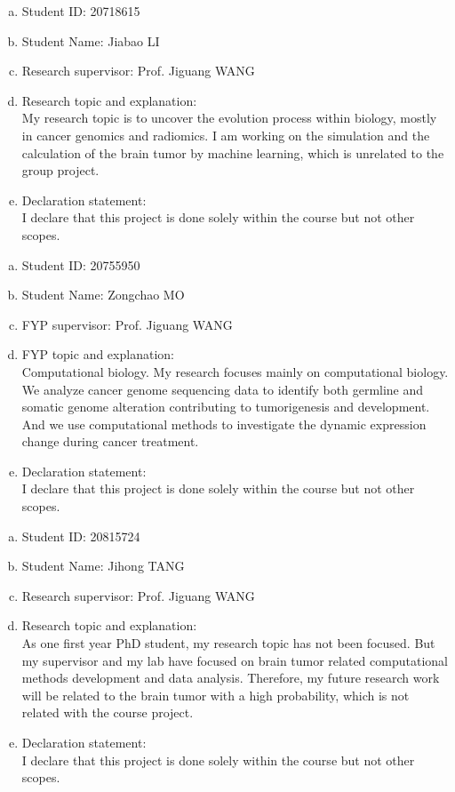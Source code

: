 \documentclass[11pt]{article}
\begin{document}
\begin{member}
	\begin{enumerate}[(a)]
		\item Student ID: 20718615
		\item Student Name: Jiabao LI
		\item Research supervisor: Prof. Jiguang WANG
		\item Research topic and explanation: \\
		My research topic is to uncover the evolution process within biology, mostly in cancer genomics and radiomics. I am working on the simulation and the calculation of the brain tumor by machine learning, which is unrelated to the group project.
		\item Declaration statement: \\
		I declare that this project is done solely within the course but not other scopes.
	\end{enumerate}
\end{member}

\begin{member}
	\begin{enumerate}[(a)]
		\item Student ID: 20755950
		\item Student Name:  Zongchao MO
		\item FYP supervisor: Prof. Jiguang WANG
		\item FYP topic and explanation: \\
		Computational biology. My research focuses mainly on computational biology. We analyze cancer genome sequencing data to identify both germline and somatic genome alteration contributing to tumorigenesis and development. And we use computational methods to investigate the dynamic expression change during cancer treatment.
		\item Declaration statement: \\
		I declare that this project is done solely within the course but not other scopes.
	\end{enumerate}
\end{member}

\begin{member}
	\begin{enumerate}[(a)]
		\item Student ID: 20815724
		\item Student Name: Jihong TANG
		\item Research supervisor: Prof. Jiguang WANG
		\item Research topic and explanation: \\
		As one first year PhD student, my research topic has not been focused. But my supervisor and my lab have focused on brain tumor related computational  methods development and data analysis. Therefore, my future research work will be related to the brain tumor with a high probability, which is not related with the course project.
		\item Declaration statement: \\
		I declare that this project is done solely within the course but not other scopes.
	\end{enumerate}
\end{member}
\end{document}
